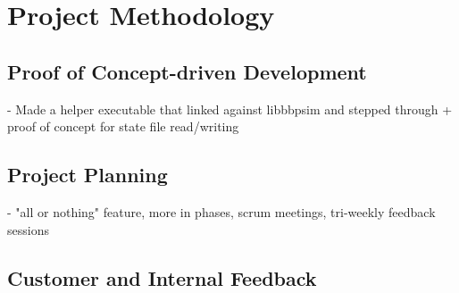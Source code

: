 {
\setlength{\parindent}{2em}
\chapter{Project Methodology}\label{cha:meth}

\section{Proof of Concept-driven Development}
- Made a helper executable that linked against libbbpsim and stepped through + proof of concept for state file read/writing
\section{Project Planning}
- "all or nothing" feature, more in phases, scrum meetings, tri-weekly feedback sessions
\section{Customer and Internal Feedback}

}